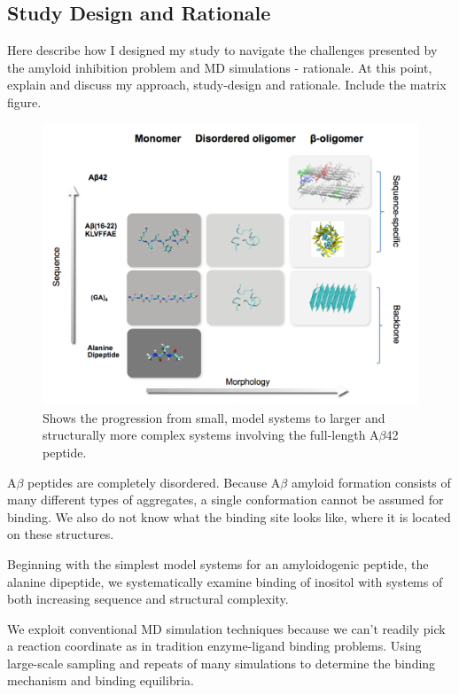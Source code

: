 \subsection{Study Design and Rationale}
\begin{outline}
	\1 Here describe how I designed my study to navigate the challenges presented by the amyloid inhibition problem and MD simulations - rationale. At this point, explain and discuss my approach, study-design and rationale. Include the matrix figure.

  \begin{figure}
    \centering
    \includegraphics[width=6in]{figures/introduction/matrix.pdf}
    \caption[Rationale]{Shows the progression from small, model systems to larger and structurally more complex systems involving the full-length A$\beta$42 peptide.}
    \label{fig:rationale}
  \end{figure}

	\1 A$\beta$ peptides are completely disordered.  Because A$\beta$ amyloid formation consists of many different types of aggregates, a single conformation cannot be assumed for binding.  We also do not know what the binding site looks like, where it is located on these structures.

	\1 Beginning with the simplest model systems for an amyloidogenic peptide, the alanine dipeptide, we systematically examine binding of inositol with systems of both increasing sequence and structural complexity.

	\1 We exploit conventional MD simulation techniques because we can't readily pick a reaction coordinate as in tradition enzyme-ligand binding problems. Using large-scale sampling and repeats of many simulations to determine the binding mechanism and binding equilibria.	
\end{outline}


